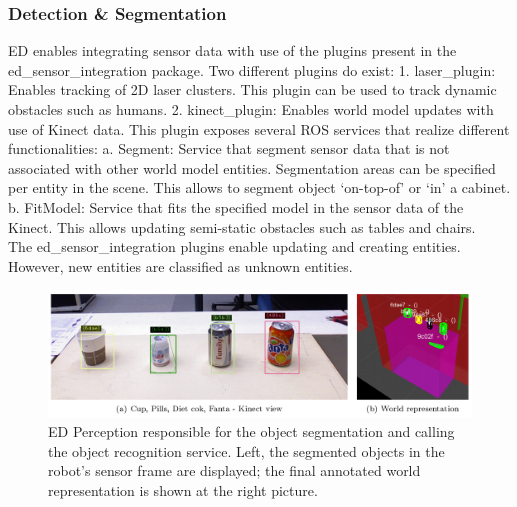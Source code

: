 \subsubsection{Detection \& Segmentation}
ED enables integrating sensor data with use of the plugins present in the ed\_sensor\_integration package. Two different plugins do exist:
1. laser\_plugin: Enables tracking of 2D laser clusters. This plugin can be used to track dynamic obstacles such as humans.
2. kinect\_plugin: Enables world model updates with use of Kinect data. This plugin exposes several ROS services that realize different functionalities:
a. Segment: Service that segment sensor data that is not associated with other world model entities. Segmentation areas can be specified per entity in the scene. This allows to segment object ‘on-top-of’ or ‘in’ a cabinet.
b. FitModel: Service that fits the specified model in the sensor data of the Kinect. This allows updating semi-static obstacles such as tables and chairs.
\\\newline
The ed\_sensor\_integration plugins enable updating and creating entities. However, new entities are classified as unknown entities.
\begin{figure}[h]
    \centering
	\includegraphics[width = 1\linewidth]{Figures/ed_perception}
    \caption{ED Perception responsible for the object segmentation and calling the object recognition service. Left, the segmented objects in the robot's sensor frame are displayed; the final annotated world representation is shown at the right picture.}
	\label{fig:ed_perception}
\end{figure}

